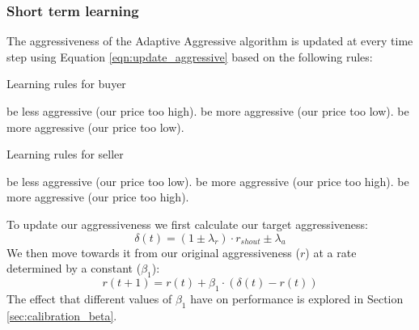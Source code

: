 \documentclass[preprint]{acm_proc_article-sp} %
\begin{document}
\subsubsection{Short term learning} \label{sec:AA_short_term_learning}
The aggressiveness of the Adaptive Aggressive algorithm is updated at every
time step using Equation \ref{eqn:update_aggressive} based on the following rules:

\begin{algorithm}[H]
  \caption{Learning rules for buyer}
  \begin{algorithmic}
            \STATE be less aggressive (our price too high).
        \ELSE
            \STATE be more aggressive (our price too low).
        \ENDIF
        \STATE be more aggressive (our price too low).
    \ENDIF
  \end{algorithmic}
  \label{alg:learning_rules_buyer}
\end{algorithm}

\begin{algorithm}[H]
  \caption{Learning rules for seller}
  \begin{algorithmic}
            \STATE be less aggressive (our price too low).
        \ELSE
            \STATE be more aggressive (our price too high).
        \ENDIF
        \STATE be more aggressive (our price too high).
    \ENDIF
  \end{algorithmic}
  \label{alg:learning_rules_seller}
\end{algorithm}

To update our aggressiveness we first calculate our target aggressiveness:
\begin{equation}
    \delta(t) = (1 \pm \lambda_r) \cdot r_{shout} \pm \lambda_a
\end{equation}
We then move towards it from our original aggressiveness ($r$) at 
a rate determined by a constant ($\beta_1$):
\begin{equation}
    r(t+1) = r(t) + \beta_1 \cdot (\delta(t) - r(t))
  \label{eqn:update_aggressive}
\end{equation}
The effect that different values of $\beta_1$ have on performance is explored in Section \ref{sec:calibration_beta}.
\end{document}
